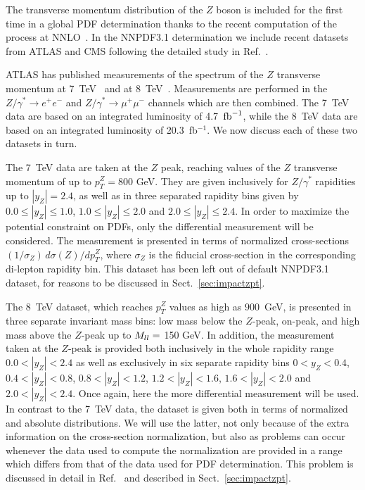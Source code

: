 The transverse momentum distribution of the $Z$ boson is included for the
first time in a global PDF determination thanks to the recent computation of the process
at NNLO~\cite{Ridder:2015dxa,Ridder:2016nkl,Boughezal:2015ded,Boughezal:2016isb}.
In the NNPDF3.1 determination we include recent datasets from ATLAS and
CMS  following the detailed study in Ref.~\cite{Boughezal:2017nla}.

%

ATLAS has published measurements of the spectrum of the $Z$ 
transverse momentum 
at 7~TeV~\cite{Aad:2014xaa} and at
$8$~TeV~\cite{Aad:2015auj}. Measurements are performed
in the $Z/\gamma^*\to e^+e^-$ and $Z/\gamma^*\to \mu^+\mu^-$ 
channels which are then combined. The 7~TeV data are based
on an integrated luminosity of 4.7~${\rm fb}^{-1}$, while the 8~TeV data are
based on an integrated luminosity of 20.3~fb$^{-1}$. We now discuss each of these two datasets in
turn.

The 7~TeV data are taken at the $Z$ peak, reaching values of the $Z$
transverse momentum of up to $p_T^Z=800$ GeV.
%
They are given inclusively for $Z/\gamma^*$ rapidities up to
$|y_Z|=2.4$, as well as in three separated rapidity bins
given by $0.0\le |y_Z| \le 1.0$, $1.0 \le |y_Z| \le
2.0$ and $2.0 \le |y_Z| \le 2.4$.
%
In order to maximize the potential constraint on PDFs, only the differential
measurement will be considered.
%
The measurement is presented in terms of normalized cross-sections
$(1/\sigma_Z)\,d\sigma(Z)/d p_T^Z$, where $\sigma_Z$
is the fiducial cross-section in the corresponding di-lepton rapidity
bin.
%
This dataset has been left out of default NNPDF3.1 dataset, for reasons to be discussed in Sect.~\ref{sec:impactzpt}.

The 8~TeV dataset, which reaches $p_T^Z$ values as high as $900$~GeV, 
is presented in three separate invariant mass bins:
low mass below the $Z$-peak, on-peak, and high mass above the $Z$-peak up to $M_{ll}=$ 150 GeV.
%
In addition, the measurement taken at the $Z$-peak
is provided both inclusively in the whole rapidity range
$0.0<|y_Z|<2.4$ as well as exclusively in six
separate rapidity bins $0<y_Z<0.4$,
$0.4<|y_Z|<0.8$, $0.8<|y_Z|<1.2$, $1.2<|y_Z|<1.6$, $1.6<|y_Z|<2.0$ and
$2.0<|y_Z|<2.4$.
%
Once again, here the more differential measurement will be used. 
%
In contrast to the 7~TeV data, the dataset is given both in terms of normalized and absolute distributions. 
We will use the latter, not only because of the extra information on the 
cross-section normalization, but also as problems can occur whenever
the data used to compute the normalization are provided in a range
which differs from that of the data used for PDF determination. This problem is 
discussed in detail in Ref.~\cite{Boughezal:2017nla} and described in Sect.~\ref{sec:impactzpt}.

